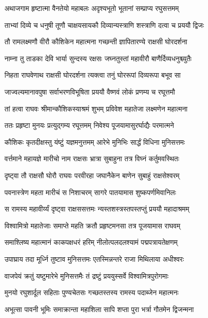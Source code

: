 \twolineshloka
{अथाजगाम हृष्टात्मा वैनतेयो महाबलः}
{अदृश्यभूतो भूतानां सम्प्राप्य रघुसत्तमम्}%

\twolineshloka
{ताभ्यां दिव्ये च धनुषी तूणौ चाक्षयसायकौ}
{दिव्यान्यस्त्राणि शस्त्राणि दत्वा च प्रययौ द्विजः}%

\twolineshloka
{तौ रामलक्ष्मणौ वीरौ कौशिकेन महात्मना}
{गच्छन्ती ज्ञापितारण्ये राक्षसी घोरदर्शना}%

\twolineshloka
{नाम्ना तु ताडका देवि भार्या सुन्दस्य रक्षसः}
{जघ्नतुस्तां महावीरौ बाणैर्दिव्यधनुश्च्युतैः}%

\twolineshloka
{निहता राघवेणाथ राक्षसी घोरदर्शना}
{त्यक्त्वा तनुं घोररूपां दिव्यरूपा बभूव सा}%

\twolineshloka
{जाज्वल्यमानावपुषा सर्वाभरणविभूषिता}
{प्रययौ वैष्णवं लोकं प्रणम्य च रघूत्तमौ}%

\twolineshloka
{तां हत्वा राघवः श्रीमान्कौशिकस्याश्रमं शुभम्}
{प्रविवेश महातेजा लक्ष्मणेन महात्मना}%

\twolineshloka
{ततः प्रहृष्टा मुनयः प्रत्युद्गम्य रघूत्तमम्}
{निवेश्य पूजयामासुरर्घाद्यैः परमात्मने}%

\twolineshloka
{कौशिकः कृतदीक्षस्तु यंष्टुं यज्ञमनुत्तमम्}
{आरेभे मुनिभिः सार्द्धं विधिना मुनिसत्तमः}%

\twolineshloka
{वर्त्तमाने महायज्ञे मारीचो नाम राक्षसः}
{भ्रात्रा सुबाहुना तत्र विघ्नं कर्तुमवस्थितः}%

\twolineshloka
{दृष्ट्वा तौ राक्षसौ घोरौ राघवः परवीरहा}
{जघानैकेन बाणेन सुबाहुं राक्षसेश्वरम्}%

\twolineshloka
{पवनास्त्रेण महता मारीचं स निशाचरम्}
{सागरे पातयामास शुष्कपर्णमिवानिलः}%

\twolineshloka
{स रामस्य महावीर्य्यं दृष्ट्वा राक्षससत्तमः}
{न्यस्तशस्त्रस्तपस्तप्तुं प्रययौ महादाश्रमम्}%

\twolineshloka
{विश्वामित्रो महातेजाः समाप्ते महति क्रतौ}
{प्रहृष्टमनसा तत्र पूजयामास राघवम्}%

\twolineshloka
{समाश्लिष्य महात्मानं काकपक्षधरं हरिम्}
{नीलोत्पलदलश्यामं पद्मपत्रायतेक्षणम्}%

\twolineshloka
{उपाघ्राय तदा मूर्ध्नि तुष्टाव मुनिसत्तमः}
{एतस्मिन्नन्तरे राजा मिथिलाया अधीश्वरः}%

\twolineshloka
{वाजपेयं क्रतुं यष्टुमारेभे मुनिसत्तमैः}
{तं द्रष्टुं प्रययुस्सर्वे विश्वामित्रपुरोगमाः}%

\twolineshloka
{मुनयो रघुशार्दूल सहिताः पुण्यचेतसः}
{गच्छतस्तस्य रामस्य पदाब्जेन महात्मनः}%

\twolineshloka
{अभूत्सा पावनी भूमिः समाक्रान्ता महाशिला}
{सापि शप्ता पुरा भर्त्रा गौतमेन द्विजन्मना}%

